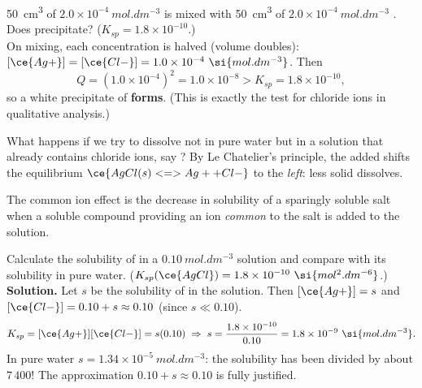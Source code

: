 \documentclass[11pt]{article}
\newcommand{\cle}[1]{{\popxbold\color{popdark}#1}}
\newcounter{popsec}
\newcounter{popsub}
\newcommand{\courssub}[1]{%
  \stepcounter{popsub}%
  \par\vspace{9pt}\noindent{\popxbold\fontsize{11.5}{13}\selectfont\color{popink}{\color{poporange}\thepopsec.\thepopsub}\hspace{6pt}#1}\par\nopagebreak\vspace{4pt}
}
\begin{document}
\begin{exemplebox}
\SI{50}{cm^3} of $2.0\times10^{-4}\ \si{mol.dm^{-3}}$  is mixed with \SI{50}{cm^3} of $2.0\times10^{-4}\ \si{mol.dm^{-3}}$ . Does  precipitate? ($K_{sp} = 1.8\times10^{-10}$.)\\
On mixing, each concentration is halved (volume doubles): $[\ce{Ag+}] = [\ce{Cl-}] = 1.0\times10^{-4}\ \si{mol.dm^{-3}}$. Then
\[
Q = (1.0\times10^{-4})^{2} = 1.0\times10^{-8} > K_{sp} = 1.8\times10^{-10},
\]
so a white precipitate of  \textbf{forms}. (This is exactly the test for chloride ions in qualitative analysis.)
\end{exemplebox}

\courssub{The Common Ion Effect}

What happens if we try to dissolve  not in pure water but in a solution that already contains chloride ions, say ? By Le Chatelier's principle, the added  shifts the equilibrium $\ce{AgCl(s) <=> Ag+ + Cl-}$ to the \emph{left}: less solid dissolves.

\begin{definition}
The \cle{common ion effect} is the decrease in solubility of a sparingly soluble salt when a soluble compound providing an ion \emph{common} to the salt is added to the solution.
\end{definition}

\begin{exoresolu}
Calculate the solubility of  in a $0.10\ \si{mol.dm^{-3}}$  solution and compare with its solubility in pure water. ($K_{sp}(\ce{AgCl}) = 1.8\times10^{-10}\ \si{mol^2.dm^{-6}}$.)
\tcblower
\textbf{Solution.} Let $s$ be the solubility of  in the  solution. Then $[\ce{Ag+}] = s$ and $[\ce{Cl-}] = 0.10 + s \approx 0.10$ (since $s \ll 0.10$).
\[
K_{sp} = [\ce{Ag+}][\ce{Cl-}] = s(0.10) \;\Rightarrow\; s = \frac{1.8\times10^{-10}}{0.10} = 1.8\times10^{-9}\ \si{mol.dm^{-3}}.
\]
In pure water $s = 1.34\times10^{-5}\ \si{mol.dm^{-3}}$: the solubility has been divided by about $7\,400$! The approximation $0.10 + s \approx 0.10$ is fully justified.
\end{exoresolu}
\end{document}
